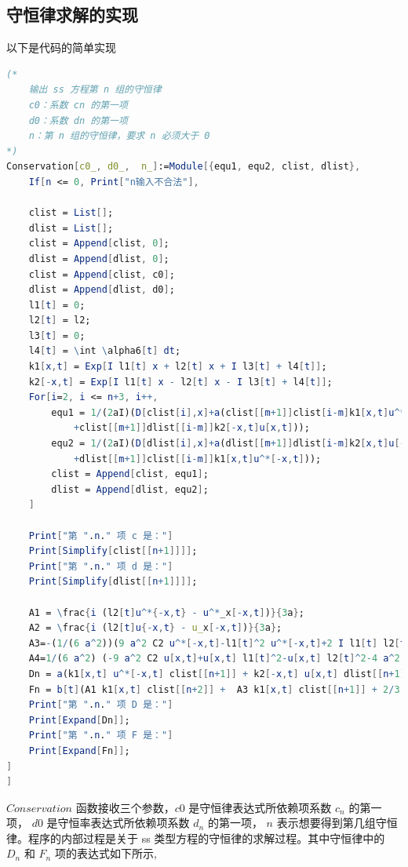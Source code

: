 \subsection{守恒律求解的实现}
以下是代码的简单实现
\begin{lstlisting}[language=Mathematica,caption=守恒律求解的实现]
(*
	输出 ss 方程第 n 组的守恒律
	c0：系数 cn 的第一项
	d0：系数 dn 的第一项
	n：第 n 组的守恒律，要求 n 必须大于 0
*)
Conservation[c0_, d0_,  n_]:=Module[{equ1, equ2, clist, dlist},
	If[n <= 0, Print["n输入不合法"],
	
	clist = List[];
	dlist = List[];
	clist = Append[clist, 0];
	dlist = Append[dlist, 0];
	clist = Append[clist, c0];
	dlist = Append[dlist, d0];
    l1[t] = 0;
    l2[t] = l2;
    l3[t] = 0;
    l4[t] = \int \alpha6[t] dt;
    k1[x,t] = Exp[I l1[t] x + l2[t] x + I l3[t] + l4[t]];
    k2[-x,t] = Exp[I l1[t] x - l2[t] x - I l3[t] + l4[t]];
    For[i=2, i <= n+3, i++,
        equ1 = 1/(2aI)(D[clist[i],x]+a(clist[[m+1]]clist[i-m]k1[x,t]u^*[-x,t]
            +clist[[m+1]]dlist[[i-m]]k2[-x,t]u[x,t]));
        equ2 = 1/(2aI)(D[dlist[i],x]+a(dlist[[m+1]]dlist[i-m]k2[x,t]u[-x,t]
            +dlist[[m+1]]clist[[i-m]]k1[x,t]u^*[-x,t]));
        clist = Append[clist, equ1];
        dlist = Append[dlist, equ2];
	]

	Print["第 ".n." 项 c 是："]
	Print[Simplify[clist[[n+1]]]];
	Print["第 ".n." 项 d 是："]
	Print[Simplify[dlist[[n+1]]]];

    A1 = \frac{i (l2[t]u^*{-x,t} - u^*_x[-x,t])}{3a};
    A2 = \frac{i (l2[t]u{-x,t} - u_x[-x,t])}{3a};
    A3=-(1/(6 a^2))(9 a^2 C2 u^*[-x,t]-l1[t]^2 u^*[-x,t]+2 I l1[t] l2[t]u^*[-x,t]+l2[t]^2 u^*[-x,t]+4 a^2 E^(2 I x l1[t]+2 l4[t]) u[x,t] u^*[-x,t]^2-2 I l1[t] D[u^*[-x,t],x]-2 l2[t]D[u^*[-x,t],x] + D[u^*[-x,t],{x,2}]);
    A4=1/(6 a^2) (-9 a^2 C2 u[x,t]+u[x,t] l1[t]^2-u[x,t] l2[t]^2-4 a^2 E^(2 I x l1[t]+2 l4[t]) u[x,t]^2 u^*[-x,t]+2 l2[t] + D[u[x,t],x] + 2I (u[x,t] l1[t]l2[t]-l1[t] D[u[x,t],x])-D[u[x,t],{x,2}]);
	Dn = a(k1[x,t] u^*[-x,t] clist[[n+1]] + k2[-x,t] u[x,t] dlist[[n+1]]);
	Fn = b[t](A1 k1[x,t] clist[[n+2]] +  A3 k1[x,t] clist[[n+1]] + 2/3 k1[x,t] u^*[-x,t] clist[[n+3]]+ 2/3 u[x,t]k2[-x,t] dlist[[n+3]]-A2 k2[-x,t] dlist[[n+2]]+A4 k2[-x,t] dlist[[n+1]]);
	Print["第 ".n." 项 D 是："]
	Print[Expand[Dn]];
	Print["第 ".n." 项 F 是："]
	Print[Expand[Fn]];
]
]
\end{lstlisting}
$Conservation$ 函数接收三个参数，$c0$ 是守恒律表达式所依赖项系数 $c_n$ 的第一项， $d0$ 是守恒率表达式所依赖项系数 $d_n$ 的第一项， $n$ 表示想要得到第几组守恒律。程序的内部过程是关于 ss 类型方程的守恒律的求解过程。其中守恒律中的 $D_n$ 和 $F_n$ 项的表达式如下所示,
